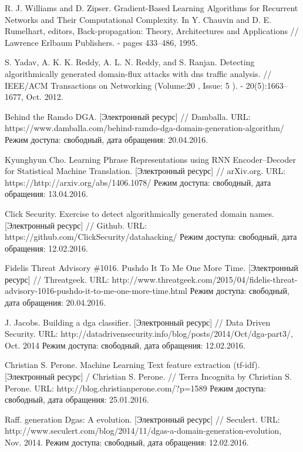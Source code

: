 \begin{thebibliography}{00}
    R. J. Williams and D. Zipser. Gradient-Based Learning Algorithms for Recurrent Networks and Their Computational Complexity. In Y. Chauvin and D. E. Rumelhart, editors, Back-propagation: Theory, Architectures and Applications // Lawrence Erlbaum Publishers. - pages 433–486, 1995.

    S. Yadav, A. K. K. Reddy, A. L. N. Reddy, and S. Ranjan.
    Detecting algorithmically generated domain-flux attacks with dns traffic analysis. //
    IEEE/ACM Transactions on Networking  (Volume:20 ,  Issue: 5 ). - 20(5):1663–1677, Oct. 2012.

    Behind the Ramdo DGA. [Электронный ресурс] // Damballa.
    URL: https://www.damballa.com/behind-ramdo-dga-domain-generation-algorithm/
    Режим доступа: свободный, дата обращения: 20.04.2016.

    Kyunghyun Cho.
    Learning Phrase Representations using RNN Encoder–Decoder for Statistical Machine Translation. [Электронный ресурс] // arXiv.org.
    URL: https://http://arxiv.org/abs/1406.1078/
    Режим доступа: свободный, дата обращения: 13.04.2016.

    Click Security. Exercise to detect algorithmically generated domain names.
    [Электронный ресурс] // Github.
    URL: https://github.com/ClickSecurity/datahacking/
    Режим доступа: свободный, дата обращения: 12.02.2016.

    Fidelis Threat Advisory \#1016. Pushdo It To Me One More Time.
    [Электронный ресурс] // Threatgeek.
    URL: http://www.threatgeek.com/2015/04/fidelis-threat-advisory-1016-pushdo-it-to-me-one-more-time.html
    Режим доступа: свободный, дата обращения: 20.04.2016.

    J. Jacobs. Building a dga classifier.
    [Электронный ресурс] // Data Driven Security.
    URL: http://datadrivensecurity.info/blog/posts/2014/Oct/dga-part3/, Oct. 2014
    Режим доступа: свободный, дата обращения: 12.02.2016.

    Christian S. Perone. Machine Learning Text feature extraction (tf-idf). [Электронный ресурс] / Christian S. Perone. // Terra Incognita by Christian S. Perone.
    URL: http://blog.christianperone.com/?p=1589
    Режим доступа: свободный, дата обращения: 25.01.2016.

    Raff. generation Dgas: A evolution.
    [Электронный ресурс] // Seculert.
    URL: http://www.seculert.com/blog/2014/11/dgas-a-domain-generation-evolution, Nov. 2014.
    Режим доступа: свободный, дата обращения: 12.02.2016.


\end{thebibliography}

